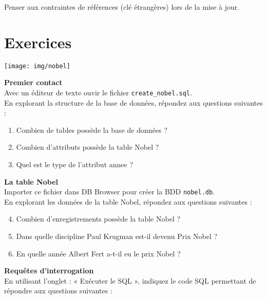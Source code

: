 \documentclass[10pt,firamath,cours]{nsi}
\begin{document}
Penser aux contraintes de références (clé étrangères) lors de la mise à jour.
\section{Exercices}

\begin{exercice}
    \begin{center}
        \texttt{[image: img/nobel]}
    \end{center}
    \textbf{Premier contact}\\
    
    Avec un éditeur de texte ouvir le fichier \texttt{create\_nobel.sql}.\\
    En explorant la structure de la base de données, répondez aux questions suivantes :	\\
    \begin{enumerate}
        \item 	Combien de tables possède la base de données ?
        \item 	Combien d'attributs possède la table Nobel ?
        \item 	Quel est le type de l'attribut annee ?\\
    \end{enumerate}
    \textbf{La table Nobel}\\
    
    Importer ce fichier dans DB Browser pour créer la BDD \texttt{nobel.db}.\\
    En explorant les données de la table Nobel, répondez aux questions suivantes :\\
    
    \begin{enumerate}
        \setcounter{enumi}{3}
        \item 	Combien d'enregistrements possède la table Nobel ?
        \item 	Dans quelle discipline Paul Krugman est-il devenu Prix Nobel ?
        \item 	En quelle année Albert Fert a-t-il eu le prix Nobel ?	\\
    \end{enumerate}

    \textbf{Requêtes d'interrogation}\\
    
    En utilisant l'onglet : « Exécuter le SQL », indiquez le code SQL permettant de répondre aux questions suivantes :\\
    

\end{exercice}
\end{document}
